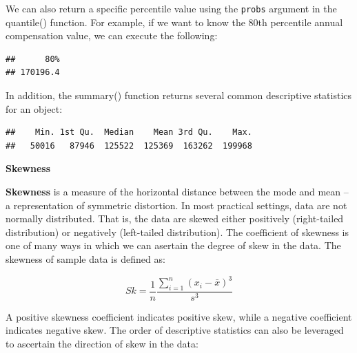 \documentclass[]{book}
\newenvironment{Shaded}{\begin{snugshade}}{\end{snugshade}}
\newcommand{\CommentTok}[1]{\textcolor[rgb]{0.56,0.35,0.01}{\textit{#1}}}
\newcommand{\DataTypeTok}[1]{\textcolor[rgb]{0.13,0.29,0.53}{#1}}
\newcommand{\FloatTok}[1]{\textcolor[rgb]{0.00,0.00,0.81}{#1}}
\newcommand{\KeywordTok}[1]{\textcolor[rgb]{0.13,0.29,0.53}{\textbf{#1}}}
\newcommand{\NormalTok}[1]{#1}
\newcommand{\OperatorTok}[1]{\textcolor[rgb]{0.81,0.36,0.00}{\textbf{#1}}}
\begin{document}
We can also return a specific percentile value using the \texttt{probs} argument in the quantile() function. For example, if we want to know the 80th percentile annual compensation value, we can execute the following:

\begin{Shaded}
\end{Shaded}

\begin{verbatim}
##      80% 
## 170196.4
\end{verbatim}

In addition, the summary() function returns several common descriptive statistics for an object:

\begin{Shaded}
\end{Shaded}

\begin{verbatim}
##    Min. 1st Qu.  Median    Mean 3rd Qu.    Max. 
##   50016   87946  125522  125369  163262  199968
\end{verbatim}

\textbf{Skewness}

\textbf{Skewness} is a measure of the horizontal distance between the mode and mean -- a representation of symmetric distortion. In most practical settings, data are not normally distributed. That is, the data are skewed either positively (right-tailed distribution) or negatively (left-tailed distribution). The coefficient of skewness is one of many ways in which we can asertain the degree of skew in the data. The skewness of sample data is defined as:

\[ Sk = \frac{1}{n} \frac{\displaystyle\sum_{i=1}^{n} (x_i-\bar{x})^3}{s^3} \]

A positive skewness coefficient indicates positive skew, while a negative coefficient indicates negative skew. The order of descriptive statistics can also be leveraged to ascertain the direction of skew in the data:
\end{document}

